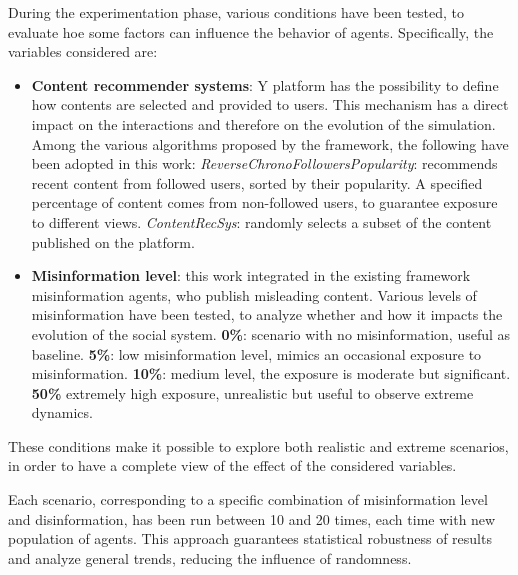 \medskip
During the experimentation phase, various conditions have been tested, to evaluate hoe some factors can influence the behavior of agents.
Specifically, the variables considered are:
\begin{itemize}
    \item \textbf{Content recommender systems}: Y platform has the possibility to define how contents are selected and provided to users.
    This mechanism has a direct impact on the interactions and therefore on the evolution of the simulation.
    Among the various algorithms proposed by the framework, the following have been adopted in this work:
        \subitem \textit{ReverseChronoFollowersPopularity}: recommends recent content from followed users, sorted by their popularity. A specified percentage of content comes from non-followed users, to guarantee exposure to different views.
        \subitem \textit{ContentRecSys}: randomly selects a subset of the content published on the platform.
    \item \textbf{Misinformation level}: this work integrated in the existing framework misinformation agents, who publish misleading content. 
    Various levels of misinformation have been tested, to analyze whether and how it impacts the evolution of the social system.
        \subitem \textbf{0\%}: scenario with no misinformation, useful as baseline.
        \subitem \textbf{5\%}: low misinformation level, mimics an occasional exposure to misinformation.
        \subitem \textbf{10\%}: medium level, the exposure is moderate but significant.
        \subitem \textbf{50\%} extremely high exposure, unrealistic but useful to observe extreme dynamics.
\end{itemize}

These conditions make it possible to explore both realistic and extreme scenarios, in order to have a complete view of the effect of the considered variables.

\medskip
Each scenario, corresponding to a specific combination of misinformation level and disinformation, has been run between 10 and 20 times, each time with new population of agents.
This approach guarantees statistical robustness of results and analyze general trends, reducing the influence of randomness. 
